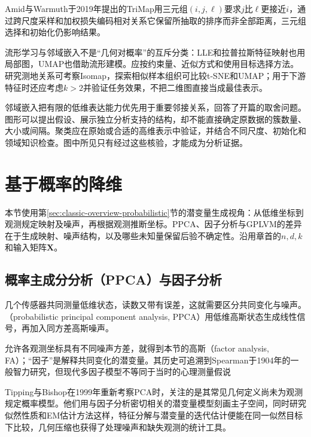 Amid与Warmuth于2019年提出的TriMap用三元组$(i,j,\ell)$要求$j$比$\ell$更接近$i$，通过跨尺度采样和加权损失编码相对关系它保留所抽取的排序而非全部距离，三元组选择和初始化仍影响结果。

流形学习与邻域嵌入不是“几何对概率”的互斥分类：LLE和拉普拉斯特征映射也用局部图，UMAP也借助流形建模。应按约束量、近似方式和使用目标选择方法。研究测地关系可考察Isomap，探索相似样本组织可比较t-SNE和UMAP；用于下游特征时还应考虑$k>2$并验证任务效果，不把二维图直接当成最佳表示。

邻域嵌入把有限的低维表达能力优先用于重要邻接关系，回答了开篇的取舍问题。图形可以提出假设、展示独立分析支持的结构，却不能直接确定原数据的簇数量、大小或间隔。聚类应在原始或合适的高维表示中验证，并结合不同尺度、初始化和领域知识检查。图中所见只有经过这些核验，才能成为分析证据。

\section{基于概率的降维}
\label{sec:dim-probabilistic}

本节使用第\ref{sec:classic-overview-probabilistic}节的潜变量生成视角：从低维坐标到观测规定映射及噪声，再根据观测推断坐标。PPCA、因子分析与GPLVM的差异在于生成映射、噪声结构，以及哪些未知量保留后验不确定性。沿用章首的$n,d,k$和输入矩阵$\bm{X}$。

\subsection{概率主成分分析（PPCA）与因子分析}
\label{sec:dim-ppca}

几个传感器共同测量低维状态，读数又带有误差，这就需要区分共同变化与噪声。（probabilistic principal component analysis, PPCA）用低维高斯状态生成线性信号，再加入同方差高斯噪声。

允许各观测坐标具有不同噪声方差，就得到本节的高斯（factor analysis, FA）；“因子”是解释共同变化的潜变量。其历史可追溯到Spearman于1904年的一般智力研究，但现代多因子模型不等同于当时的心理测量假说

Tipping与Bishop在1999年重新考察PCA时，关注的是其常见几何定义尚未为观测规定概率模型。他们用与因子分析密切相关的潜变量模型刻画主子空间，同时研究似然性质和EM估计方法这样，特征分解与潜变量的迭代估计便能在同一似然目标下比较，几何压缩也获得了处理噪声和缺失观测的统计工具。

